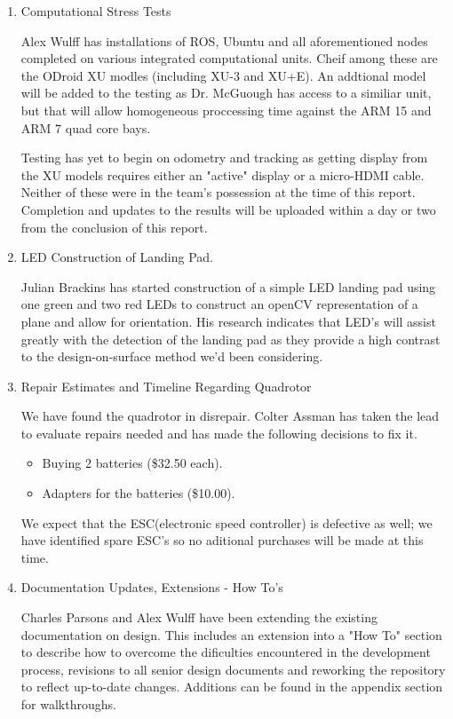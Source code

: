 \begin{enumerate}

\item Computational Stress Tests

Alex Wulff has installations of ROS, Ubuntu and all aforementioned nodes completed on various integrated computational units.  Cheif among these are the ODroid XU modles (including XU-3 and XU+E).  An addtional model will be added to the testing as Dr. McGuough has access to a similiar unit, but that will allow homogeneous proccessing time against the ARM 15 and ARM 7 quad core bays.

Testing has yet to begin on odometry and tracking as getting display from the XU models requires either an "active" display or a micro-HDMI cable.  Neither of these were in the team's possession at the time of this report.  Completion and updates to the results will be uploaded within a day or two from the conclusion of this report.

\item LED Construction of Landing Pad.

Julian Brackins has started construction of a simple LED landing pad using one green and two red LEDs to construct an openCV representation of a plane and allow for orientation.  His research indicates that LED's will assist greatly with the detection of the landing pad as they provide a high contrast to the design-on-surface method we'd been considering.

\item Repair Estimates and Timeline Regarding Quadrotor

We have found the quadrotor in disrepair.  Colter Assman has taken the lead to evaluate repairs needed and has made the following decisions to fix it. 

\begin{itemize}

\item Buying 2 batteries (\$32.50 each).

\item Adapters for the batteries (\$10.00). 

\end{itemize}

We expect that the ESC(electronic speed controller) is defective as well; we have identified spare ESC's so no aditional purchases will be made at this time. 

\item Documentation Updates, Extensions - How To's

Charles Parsons and Alex Wulff have been extending the existing documentation on design.  This includes an extension into a "How To" section to describe how to overcome the dificulties encountered in the development process, revisions to all senior design documents and reworking the repository to reflect up-to-date changes.  Additions can be found in the appendix section for walkthroughs.

\end{enumerate}

